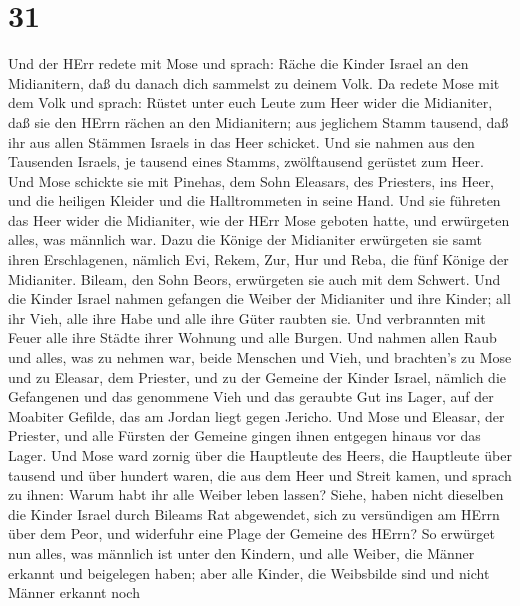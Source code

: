 \hypertarget{section-30}{%
\section{31}\label{section-30}}

 Und der HErr redete mit Mose und sprach:  Räche
die Kinder Israel an den Midianitern, daß du danach dich sammelst zu
deinem Volk.  Da redete Mose mit dem Volk und sprach: Rüstet
unter euch Leute zum Heer wider die Midianiter, daß sie den HErrn rächen
an den Midianitern;  aus jeglichem Stamm tausend, daß ihr
aus allen Stämmen Israels in das Heer schicket.  Und sie
nahmen aus den Tausenden Israels, je tausend eines Stamms, zwölftausend
gerüstet zum Heer.  Und Mose schickte sie mit Pinehas, dem
Sohn Eleasars, des Priesters, ins Heer, und die heiligen Kleider und die
Halltrommeten in seine Hand.  Und sie führeten das Heer
wider die Midianiter, wie der HErr Mose geboten hatte, und erwürgeten
alles, was männlich war.  Dazu die Könige der Midianiter
erwürgeten sie samt ihren Erschlagenen, nämlich Evi, Rekem, Zur, Hur und
Reba, die fünf Könige der Midianiter. Bileam, den Sohn Beors, erwürgeten
sie auch mit dem Schwert.  Und die Kinder Israel nahmen
gefangen die Weiber der Midianiter und ihre Kinder; all ihr Vieh, alle
ihre Habe und alle ihre Güter raubten sie.  Und verbrannten
mit Feuer alle ihre Städte ihrer Wohnung und alle Burgen. 
Und nahmen allen Raub und alles, was zu nehmen war, beide Menschen und
Vieh,  und brachten's zu Mose und zu Eleasar, dem Priester,
und zu der Gemeine der Kinder Israel, nämlich die Gefangenen und das
genommene Vieh und das geraubte Gut ins Lager, auf der Moabiter Gefilde,
das am Jordan liegt gegen Jericho.  Und Mose und Eleasar,
der Priester, und alle Fürsten der Gemeine gingen ihnen entgegen hinaus
vor das Lager.  Und Mose ward zornig über die Hauptleute
des Heers, die Hauptleute über tausend und über hundert waren, die aus
dem Heer und Streit kamen,  und sprach zu ihnen: Warum habt
ihr alle Weiber leben lassen?  Siehe, haben nicht dieselben
die Kinder Israel durch Bileams Rat abgewendet, sich zu versündigen am
HErrn über dem Peor, und widerfuhr eine Plage der Gemeine des HErrn?
 So erwürget nun alles, was männlich ist unter den Kindern,
und alle Weiber, die Männer erkannt und beigelegen haben; 
aber alle Kinder, die Weibsbilde sind und nicht Männer erkannt noch
